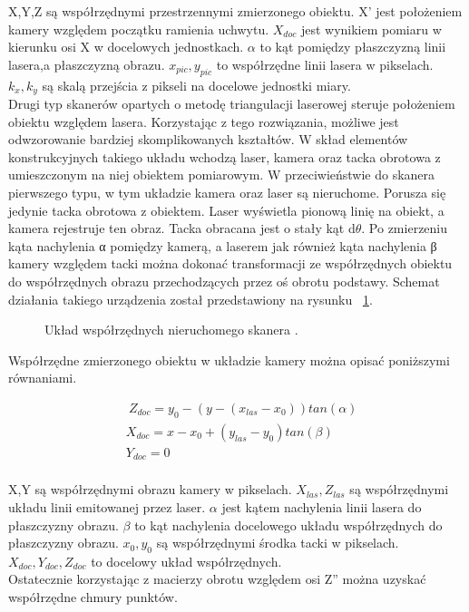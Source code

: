 \noindent X,Y,Z są współrzędnymi przestrzennymi zmierzonego obiektu. X' jest położeniem kamery względem początku ramienia uchwytu. $X_{doc}$ jest wynikiem pomiaru w kierunku osi X w docelowych jednostkach. $\alpha$ to kąt pomiędzy płaszczyzną linii lasera,a płaszczyzną obrazu. $x_{pic},y_{pic}$ to współrzędne linii lasera w pikselach. $k_{x},k_{y}$ są skalą przejścia z pikseli na docelowe jednostki miary.\\
\indent Drugi typ skanerów opartych o metodę triangulacji laserowej steruje położeniem obiektu względem lasera. Korzystając z tego rozwiązania, możliwe jest odwzorowanie bardziej skomplikowanych kształtów. W skład elementów konstrukcyjnych takiego układu wchodzą laser, kamera oraz tacka obrotowa z umieszczonym na niej obiektem pomiarowym.
W przeciwieństwie do skanera pierwszego typu, w tym układzie kamera oraz laser są nieruchome. Porusza się jedynie tacka obrotowa z obiektem. Laser wyświetla pionową linię na obiekt, a kamera rejestruje ten obraz. Tacka obracana jest o stały kąt d$\theta$. Po zmierzeniu kąta nachylenia α pomiędzy kamerą, a laserem jak również kąta nachylenia β kamery względem tacki można dokonać transformacji ze współrzędnych obiektu do współrzędnych obrazu przechodzących przez oś obrotu podstawy. Schemat działania takiego urządzenia został przedstawiony na rysunku ~\ref{fig:triangPic2}.

\begin{figure}[H]
  \centering
    

  \caption{Układ współrzędnych nieruchomego skanera \cite{mikulski2013metody}.}   
  \label{fig:triangPic2}
\end{figure}
\newline
Współrzędne zmierzonego obiektu w układzie kamery można opisać poniższymi równaniami.

\begin{equation}
    \begin{aligned}
        & \ Z_{doc}=y_{0}-(y-(x_{las}-x_{0}))tan(\alpha) \\
          & X_{doc}=x-x_{0}+(y_{las}-y_{0})tan(\beta) \\
          & Y_{doc}=0\\
    \end{aligned}
\end{equation}

X,Y są współrzędnymi obrazu kamery w pikselach. $X_{las},Z_{las}$ są współrzędnymi układu linii emitowanej przez laser. $\alpha$ jest kątem nachylenia linii lasera do płaszczyzny obrazu. $\beta$ to kąt nachylenia docelowego układu współrzędnych do płaszczyzny obrazu. $x_{0},y_{0}$ są współrzędnymi środka tacki w pikselach. $X_{doc},Y_{doc},Z_{doc}$ to docelowy układ współrzędnych.\\
\indent Ostatecznie korzystając z macierzy obrotu względem osi Z'' można uzyskać współrzędne chmury punktów.
\newline

